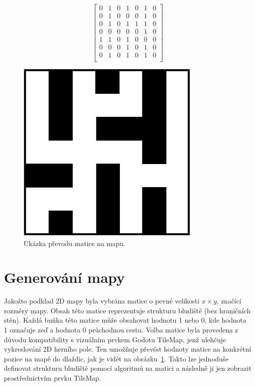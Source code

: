 \begin{figure}[ht]
    \centering
    \begin{minipage}[c]{0.48\textwidth}
        \centering
        \[
        \begin{bmatrix}
            0 & 1 & 0 & 1 & 0 & 1 & 0 \\
            0 & 1 & 0 & 0 & 0 & 1 & 0 \\
            0 & 1 & 0 & 1 & 1 & 1 & 0 \\
            0 & 0 & 0 & 0 & 0 & 1 & 0 \\
            1 & 1 & 0 & 1 & 0 & 0 & 0 \\
            0 & 0 & 0 & 1 & 0 & 1 & 0 \\
            0 & 1 & 0 & 1 & 0 & 1 & 0 \\
        \end{bmatrix}
        \]
    \end{minipage}
    \begin{minipage}[c]{0.48\textwidth}
        \centering
        \includegraphics[width=0.8\textwidth]{obrazky-figures/ch4/matrix_to_maze.pdf}
    \end{minipage}
    \caption{Ukázka převodu matice na mapu.}
    \label{fig:matrix_to_maze}
\end{figure}
\vspace{1.3cm}

\section{Generování mapy}
Jakožto podklad 2D mapy byla vybrána matice o pevné velikosti $x \times y$, značící rozměry mapy. Obsah této matice reprezentuje strukturu bludiště (bez hraničních stěn). Každá buňka této matice může obsahovat hodnotu 1 nebo 0, kde hodnota 1 označuje zeď a hodnota 0 průchodnou cestu. Volba matice byla provedena z důvodu kompatibility s vizuálním prvkem Godotu TileMap, jenž ulehčuje vykreslování 2D herního pole. Ten umožňuje převést hodnoty matice na konkrétní pozice na mapě do dlaždic, jak je vidět na obrázku~\ref{fig:matrix_to_maze}. Takto lze jednoduše definovat strukturu bludiště pomocí algoritmů na matici a následně ji jen zobrazit prostřednictvím prvku TileMap.

